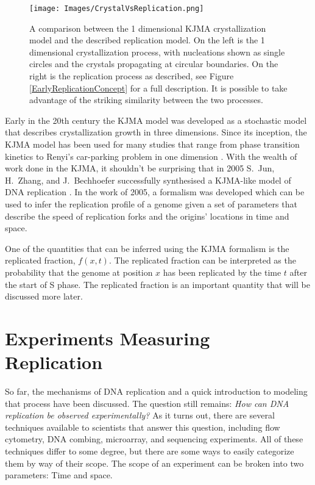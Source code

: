 	\begin{figure}[tbh]
		\begin{center}
			\texttt{[image: Images/CrystalVsReplication.png]}
		\end{center}
			\caption[Comparing Crystallization with Replication]{\label{fig:CrystalVsReplication} A comparison between the 1 dimensional KJMA crystallization model and the described replication model.
				On the left is the 1 dimensional crystallization process, with nucleations shown as single circles and the crystals propagating at circular boundaries.
				On the right is the replication process as described, see Figure \ref{EarlyReplicationConcept} for a full description.
				It is possible to take advantage of the striking similarity between the two processes.}
	\end{figure}
	
	Early in the 20th century the KJMA model was developed as a stochastic model that describes crystallization growth in three dimensions.
	Since its inception, the KJMA model has been used for many studies that range from phase transition kinetics \cite{AlloyPhaseTransitions} to Renyi's car-parking problem in one dimension \cite{CarParking}.
	With the wealth of work done in the KJMA, it shouldn't be surprising that in 2005 S.~Jun, H.~Zhang, and J.~Bechhoefer successfully synthesised a KJMA-like model of DNA replication \cite{KJMA1,KJMA2}.
	In the work of 2005, a formalism was developed which can be used to infer the replication profile of a genome given a set of parameters that describe the speed of replication forks and the origins' locations in time and space.
	
	One of the quantities that can be inferred using the KJMA formalism is the replicated fraction, $f(x,t)$.
	The replicated fraction can be interpreted as the probability that the genome at position $x$ has been replicated by the time $t$ after the start of S phase.
	The replicated fraction is an important quantity that will be discussed more later.
	
	
	\section{Experiments Measuring Replication}
	\label{sec:Experiments}
	
	So far, the mechanisms of DNA replication and a quick introduction to modeling that process have been discussed.
	The question still remains:
	\emph{How can DNA replication be observed experimentally?}
	As it turns out, there are several techniques available to scientists that answer this question, including flow cytometry\cite{DeepSeq}, DNA combing\cite{DNACombing}, microarray\cite{McCuneMicroArray}, and sequencing experiments\cite{DeepSeq}.
	All of these techniques differ to some degree, but there are some ways to easily categorize them by way of their scope.
	The scope of an experiment can be broken into two parameters: Time and space.
	
